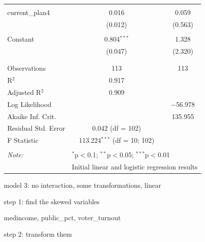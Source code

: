 \documentclass[
]{article}
\newenvironment{Shaded}{\begin{snugshade}}{\end{snugshade}}
\newcommand{\DataTypeTok}[1]{\textcolor[rgb]{0.13,0.29,0.53}{#1}}
\newcommand{\FloatTok}[1]{\textcolor[rgb]{0.00,0.00,0.81}{#1}}
\newcommand{\KeywordTok}[1]{\textcolor[rgb]{0.13,0.29,0.53}{\textbf{#1}}}
\newcommand{\NormalTok}[1]{#1}
\newcommand{\OperatorTok}[1]{\textcolor[rgb]{0.81,0.36,0.00}{\textbf{#1}}}
\newcommand{\StringTok}[1]{\textcolor[rgb]{0.31,0.60,0.02}{#1}}
\begin{document}
\begin{table}[!htbp]
\begin{tabular}{@{\extracolsep{5pt}}lcc}
  & & \\ 
 current\_plan4 & 0.016 & 0.059 \\ 
  & (0.012) & (0.563) \\ 
  & & \\ 
 Constant & 0.804$^{***}$ & 1.328 \\ 
  & (0.047) & (2.320) \\ 
  & & \\ 
\hline \\[-1.8ex] 
Observations & 113 & 113 \\ 
R$^{2}$ & 0.917 &  \\ 
Adjusted R$^{2}$ & 0.909 &  \\ 
Log Likelihood &  & $-$56.978 \\ 
Akaike Inf. Crit. &  & 135.955 \\ 
Residual Std. Error & 0.042 (df = 102) &  \\ 
F Statistic & 113.224$^{***}$ (df = 10; 102) &  \\ 
\hline 
\hline \\[-1.8ex] 
\textit{Note:}  & \multicolumn{2}{l}{$^{*}$p$<$0.1; $^{**}$p$<$0.05; $^{***}$p$<$0.01} \\ 
 & \multicolumn{2}{l}{Initial linear and logistic regression results} \\ 
\end{tabular} 
\end{table}

model 3: no interaction, some transformations, linear

step 1: find the skewed variables

medincome, public\_pct, voter\_turnout

step 2: transform them

\begin{Shaded}
\end{Shaded}
\end{document}
